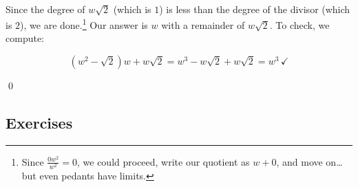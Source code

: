 \begin{ex}
\begin{enumerate}
\[\begin{array}{cccccccccccc}
\end{array}\]
\setlength\arraycolsep{5pt}
\setlength\extrarowheight{0pt}

Since the degree of $w\sqrt{2}$ (which is $1$) is less than the degree of the divisor (which is $2$), we are done.\footnote{Since $\frac{0w^2}{w^2} = 0$, we could proceed, write our quotient as $w+0$, and move on\ldots but even pedants have limits.}  Our answer is $w$ with a remainder of $w \sqrt{2}$.  To check, we compute:

\[ \left(w^2 - \sqrt{2}\right)w + w\sqrt{2} = w^3 - w\sqrt{2} + w\sqrt{2} = w^3 \, \checkmark\]

\vspace{-0.3in}\qed

\end{enumerate}

\end{ex}

\clearpage

\subsection{Exercises}



\closegraphsfile